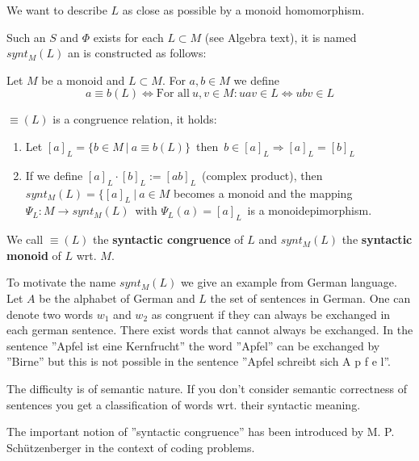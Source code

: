 We want to describe $L$ as close as possible by a monoid homomorphism.

Such an $S$ and $\Phi$ exists for each $L \subset M$ (see Algebra text), it is
named $synt_M(L)$ an is constructed as follows:

\begin{definition}
Let $M$ be a monoid and $L \subset M$. For $a, b \in M$ we define
\[ a \equiv b (L) \Leftrightarrow \mbox{For all}\ u, v \in M: u a v \in L
\Leftrightarrow u b v \in L
\]
\end{definition}

$\equiv (L)$ is a congruence relation, it holds:
\begin{enumerate}
  \item Let $[a]_L = \{ b \in M\ |\ a \equiv b (L) \}$\ then\ $b \in [a]_L
  \Rightarrow [a]_L = [b]_L $
  \item If we define $[a]_L \cdot [b]_L := [a b]_L$\ (complex product), then
  $synt_M(L) = \{ [a]_L\ |\ a \in M$ becomes a monoid and the mapping $\Psi_L :
  M \to synt_M(L)$\ with $\Psi_L(a) = [a]_L$\ is a monoidepimorphism.
\end{enumerate}

We call $\equiv (L)$ the {\bf syntactic congruence} of $L$ and $synt_M(L)$ the
{\bf syntactic monoid} of $L$ wrt. $M$.

To motivate the name $synt_M(L)$ we give an example from German language. Let
$A$ be the alphabet of German and $L$ the set of sentences in German. One can
denote two words $w_1$ and $w_2$ as congruent if they can always be exchanged in
each german sentence. There exist words that cannot always be exchanged. In the
sentence ''Apfel ist eine Kernfrucht'' the word ''Apfel'' can be exchanged by
''Birne'' but this is not possible in the sentence ''Apfel schreibt sich A p f e
l''.

The difficulty is of semantic nature. If you don't consider semantic correctness
of sentences you get a classification of words wrt. their syntactic meaning.

The important notion of ''syntactic congruence'' has been introduced by M. P.
Sch\"utzenberger in the context of coding problems.

